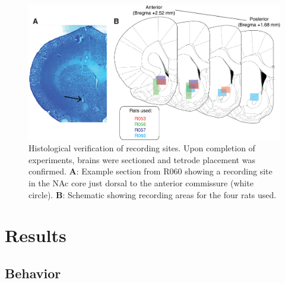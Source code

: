 \documentclass[11pt]{article}
\newcommand{\bsf}[1]{\textbf{#1}}
\begin{document}
{\begin{figure}[h]
\centering
\includegraphics[width=\textwidth]{Fig 3 - Histology.png}
\caption{Histological verification of recording sites. Upon completion of
  experiments, brains were sectioned and tetrode placement was
  confirmed. \bsf{A}: Example section from R060 showing a recording site in the
  NAc core just dorsal to the anterior commissure (white circle). \bsf{B}:
  Schematic showing recording areas for the four rats used.}
\label{fig:histo}
\end{figure}

\section*{Results}

\subsection*{Behavior}

}
\end{document}
